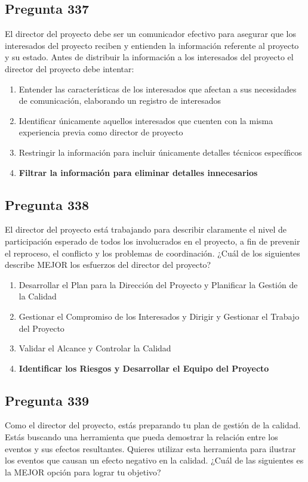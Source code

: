 \documentclass[11pt,a4paper]{article}
\begin{document}
\subsection*{Pregunta 337}
El director del proyecto debe ser un comunicador efectivo para asegurar que los interesados del proyecto reciben y entienden la información referente al proyecto y su estado. Antes de distribuir la información a los interesados del proyecto el director del proyecto debe intentar:

\begin{enumerate}[label=\alph*)]
  \item Entender las características de los interesados que afectan a sus necesidades de comunicación, elaborando un registro de interesados
  \item Identificar únicamente aquellos interesados que cuenten con la misma experiencia previa como director de proyecto
  \item Restringir la información para incluir únicamente detalles técnicos específicos
  \item \textbf{Filtrar la información para eliminar detalles innecesarios}
\end{enumerate}

\subsection*{Pregunta 338}
El director del proyecto está trabajando para describir claramente el nivel de participación esperado de todos los involucrados en el proyecto, a fin de prevenir el reproceso, el conflicto y los problemas de coordinación. ¿Cuál de los siguientes describe MEJOR los esfuerzos del director del proyecto?

\begin{enumerate}[label=\alph*)]
  \item Desarrollar el Plan para la Dirección del Proyecto y Planificar la Gestión de la Calidad
  \item Gestionar el Compromiso de los Interesados y Dirigir y Gestionar el Trabajo del Proyecto
  \item Validar el Alcance y Controlar la Calidad
  \item \textbf{Identificar los Riesgos y Desarrollar el Equipo del Proyecto}
\end{enumerate}

\subsection*{Pregunta 339}
Como el director del proyecto, estás preparando tu plan de gestión de la calidad. Estás buscando una herramienta que pueda demostrar la relación entre los eventos y sus efectos resultantes. Quieres utilizar esta herramienta para ilustrar los eventos que causan un efecto negativo en la calidad. ¿Cuál de las siguientes es la MEJOR opción para lograr tu objetivo?
\end{document}
